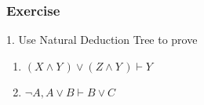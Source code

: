 \documentclass{beamer}
\begin{document}
\begin{frame}[fragile]
    \frametitle{Exercise}
    1. Use Natural Deduction Tree to prove
    \begin{enumerate}
        \item $(X \wedge Y\, ) \vee (Z \wedge Y\, ) \vdash Y$
        \item $\neg A, A\vee B \vdash B \vee C$
    \end{enumerate}
    \vspace{2em}
    \pause
    \begin{minipage}[b]{0.43\linewidth}
        \centering
    \end{minipage}
    \begin{minipage}[b]{0.43\linewidth}
        \centering
    \end{minipage}
\end{frame}
\end{document}
